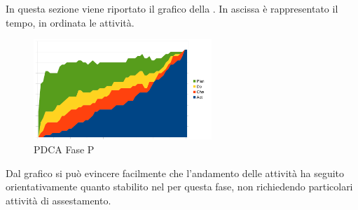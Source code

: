 In questa sezione viene riportato il grafico  della . In ascissa è rappresentato il tempo, in ordinata le attività.
\begin{figure}[H]
	\centering
	\includegraphics[width=0.6\textwidth]{PianoDiQualifica/Pics/GraficoPDCAFaseSD.pdf}
	\caption{PDCA Fase P}
\end{figure}
Dal grafico si può evincere facilmente che l'andamento delle attività ha seguito orientativamente quanto stabilito nel  per questa fase, non richiedendo particolari attività di assestamento.




							






